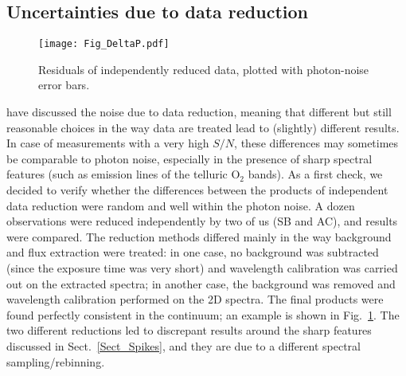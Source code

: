 \documentclass[a4paper]{aa}
\newcommand{\snr}{\ensuremath{S/N}}
\begin{document}
\subsection{Uncertainties due to data reduction}
\begin{figure}
\begin{center}
\texttt{[image: Fig\_DeltaP.pdf]}
\end{center}
\caption{\label{Fig_DeltaP} Residuals of independently reduced data, plotted with photon-noise error bars.}
\end{figure}
\citet{Bagetal12} have discussed the noise due to data reduction,
meaning that different but still reasonable choices in the way data
are treated lead to (slightly) different results. In case of measurements with a very high
\snr, these differences may sometimes be comparable to
photon noise, especially in the presence of sharp spectral features (such as
emission lines of the telluric O$_2$ bands). As a first check, we
decided to verify whether the differences between the products of independent
data reduction were random and well within the photon noise. A dozen
observations were reduced independently by two of us (SB and AC), and
results were compared.  The reduction methods differed mainly in the
way background and flux extraction were treated: in one case, no
background was subtracted (since the exposure time was very short) and
wavelength calibration was carried out on the extracted spectra; in
another case, the background was removed and wavelength calibration
performed on the 2D spectra. The final products were found perfectly
consistent in the continuum; an example is shown in
Fig.~\ref{Fig_DeltaP}. The two different reductions led to
discrepant results around the sharp features discussed in
Sect.~\ref{Sect_Spikes}, and they are due to a different spectral
sampling/rebinning.
\end{document}
